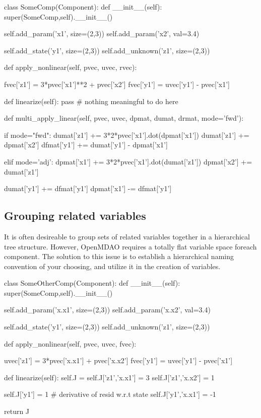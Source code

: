 \documentclass[12pt]{article}
\begin{document}
\begin{pyglist}[language=python]
    class SomeComp(Component):
        def __init__(self):
            super(SomeComp,self).__init__()

            self.add_param('x1', size=(2,3))
            self.add_param('x2', val=3.4)

            self.add_state('y1', size=(2,3))
            self.add_unknown('z1', size=(2,3))

        def apply_nonlinear(self, pvec, uvec, rvec):

            fvec['z1'] = 3*pvec['x1']**2 + pvec['x2']
            fvec['y1'] = uvec['y1'] - pvec['x1']

        def linearize(self):
            pass # nothing meaningful to do here

        def multi_apply_linear(self, pvec, uvec, dpmat, dumat, drmat, mode='fwd'):

            if mode="fwd":
                dumat['z1'] += 3*2*pvec['x1'].dot(dpmat['x1'])
                dumat['z1'] += dpmat['x2']
                dfmat['y1'] += dumat['y1'] - dpmat['x1']

            elif mode='adj':
                dpmat['x1'] += 3*2*pvec['x1'].dot(dumat['z1'])
                dpmat['x2'] += dumat['z1']

                dumat['y1'] += dfmat['y1']
                dpmat['x1'] -= dfmat['y1']
\end{pyglist}

\subsection{Grouping related variables}
It is often desireable to group sets of related variables together in a hierarchical
tree structure. However, OpenMDAO requires a totally flat variable space foreach component.
The solution to this issue is to establish a hierarchical naming convention of your choosing, and
utilize it in the creation of variables.

\begin{pyglist}[language=python]
    class SomeOtherComp(Component):
        def __init__(self):
            super(SomeComp,self).__init__()

            self.add_param('x.x1', size=(2,3))
            self.add_param('x.x2', val=3.4)

            self.add_state('y1', size=(2,3))
            self.add_unknown('z1', size=(2,3))

        def apply_nonlinear(self, pvec, uvec, fvec):

            uvec['z1'] = 3*pvec['x.x1'] + pvec['x.x2']
            fvec['y1'] = uvec['y1'] - pvec['x1']

        def linearize(self):
            self.J = {}
            self.J['z1','x.x1'] = 3
            self.J['z1','x.x2'] = 1

            self.J['y1'] = 1 # derivative of resid w.r.t state
            self.J['y1','x.x1'] = -1

            return J
\end{pyglist}
\end{document}
